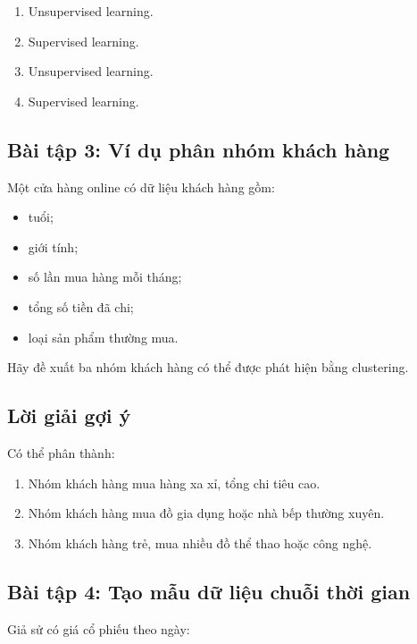 \begin{enumerate}
    \item Unsupervised learning.
    \item Supervised learning.
    \item Unsupervised learning.
    \item Supervised learning.
\end{enumerate}

\subsection*{Bài tập 3: Ví dụ phân nhóm khách hàng}

Một cửa hàng online có dữ liệu khách hàng gồm:

\begin{itemize}
    \item tuổi;
    \item giới tính;
    \item số lần mua hàng mỗi tháng;
    \item tổng số tiền đã chi;
    \item loại sản phẩm thường mua.
\end{itemize}

Hãy đề xuất ba nhóm khách hàng có thể được phát hiện bằng clustering.

\subsection*{Lời giải gợi ý}

Có thể phân thành:

\begin{enumerate}
    \item Nhóm khách hàng mua hàng xa xỉ, tổng chi tiêu cao.
    \item Nhóm khách hàng mua đồ gia dụng hoặc nhà bếp thường xuyên.
    \item Nhóm khách hàng trẻ, mua nhiều đồ thể thao hoặc công nghệ.
\end{enumerate}

\subsection*{Bài tập 4: Tạo mẫu dữ liệu chuỗi thời gian}

Giả sử có giá cổ phiếu theo ngày:


